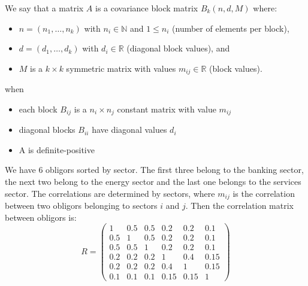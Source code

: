 \documentclass[11pt,fleqn]{book} %
\begin{document}
\begin{definition}
	We say that a matrix $A$ is a covariance block matrix $B_k(n,d,M)$ where:
	\begin{itemize}
		\item $n=(n_1,\dots,n_k)$ with $n_i \in \mathbb{N}$ and $1 \le n_i$ (number of elements per block),
		\item $d=(d_1,\dots,d_k)$ with $d_i \in \mathbb{R}$ (diagonal block values), and
		\item $M$ is a $k {\times} k$ symmetric matrix with values $m_{ij} \in \mathbb{R}$ (block values).
	\end{itemize}
	when
	\begin{itemize}
		\item each block $B_{ij}$ is a $n_i {\times} n_j$ constant matrix with value $m_{ij}$
		\item diagonal blocks $B_{ii}$ have diagonal values $d_i$
		\item A is definite-positive
	\end{itemize}
\end{definition}

\begin{example}
	\label{example1}
	We have $6$ obligors sorted by sector. The first three belong to the 
	banking sector, the next two belong to the energy sector 
	and the last one belongs to the services sector. The correlations are 
	determined by sectors, where $m_{ij}$ is the correlation between two 
	obligors belonging to sectors $i$ and $j$. Then the correlation matrix 
	between obligors is:
	\begin{displaymath}
		R=
		\left(
		\begin{array}{ccc|cc|c} 
			1   & 0.5 & 0.5 & 0.2  & 0.2  & 0.1  \\ 
			0.5 & 1   & 0.5 & 0.2  & 0.2  & 0.1  \\ 
			0.5 & 0.5 & 1   & 0.2  & 0.2  & 0.1  \\ 
			\hline
			0.2 & 0.2 & 0.2 & 1    & 0.4  & 0.15 \\ 
			0.2 & 0.2 & 0.2 & 0.4  & 1    & 0.15 \\ 
			\hline
			0.1 & 0.1 & 0.1 & 0.15 & 0.15 & 1    
		\end{array} 
		\right)
	\end{displaymath}
\end{example}
\end{document}
